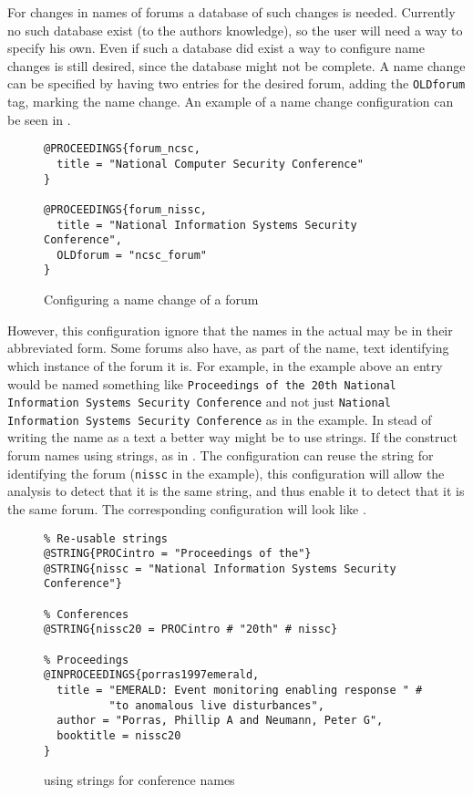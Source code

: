 For changes in names of forums a database of such changes is needed.
Currently no such database exist (to the authors knowledge), so the
user will need a way to specify his own.  Even if such a database did
exist a way to configure name changes is still desired, since the
database might not be complete.  A name change can be specified by
having two entries for the desired forum, adding the \texttt{OLDforum}
tag, marking the name change.  An example of a name change
configuration can be seen in
.

\begin{figure}
  \centering
\begin{verbatim}
@PROCEEDINGS{forum_ncsc,
  title = "National Computer Security Conference"
}

@PROCEEDINGS{forum_nissc,
  title = "National Information Systems Security Conference",
  OLDforum = "ncsc_forum"
}
\end{verbatim}
  \caption{Configuring a name change of a forum}
  \label{fig:analyzing_configuration_name_change}
\end{figure}

However, this configuration ignore that the names in the actual
 may be in their abbreviated form.  Some forums also have,
as part of the name, text identifying which instance of the forum it
is.  For example, in the example above an entry would be named
something like \texttt{Proceedings of the 20th National Information
  Systems Security Conference} and not just \texttt{National
  Information Systems Security Conference} as in the example.  In
stead of writing the name as a text a better way might be to use
strings.  If the  construct forum names using strings, as in
.
The configuration can reuse the string for identifying the forum
(\texttt{nissc} in the example), this configuration will allow the
analysis to detect that it is the same string, and thus enable it to
detect that it is the same forum.  The corresponding configuration
will look like
.

\begin{figure}
  \centering
\begin{small}
\begin{verbatim}
% Re-usable strings
@STRING{PROCintro = "Proceedings of the"}
@STRING{nissc = "National Information Systems Security Conference"}

% Conferences
@STRING{nissc20 = PROCintro # "20th" # nissc}

% Proceedings
@INPROCEEDINGS{porras1997emerald,
  title = "EMERALD: Event monitoring enabling response " #
          "to anomalous live disturbances",
  author = "Porras, Phillip A and Neumann, Peter G",
  booktitle = nissc20
}
\end{verbatim}
\end{small}
  \caption{ using strings for conference names}
  \label{fig:analyzing_configuration_name_change_bib_file_strings}
\end{figure}


